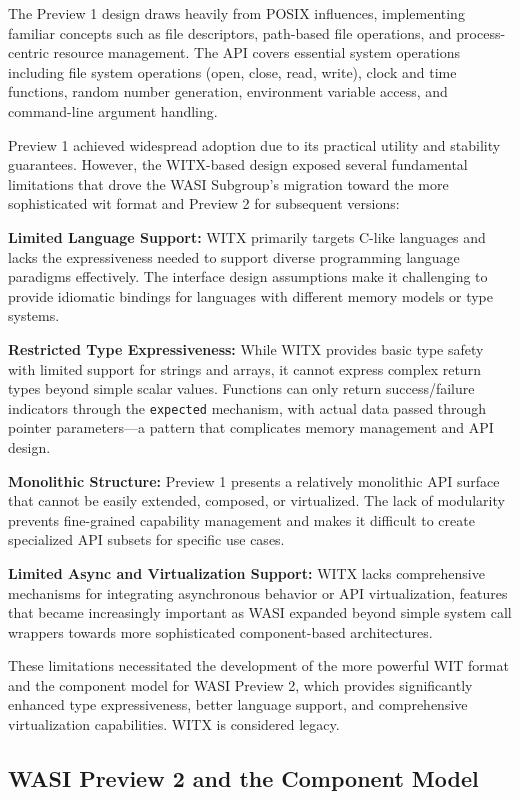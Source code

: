 The Preview 1 design draws heavily from POSIX influences, implementing familiar concepts such as file descriptors, path-based file operations, and process-centric resource management. The API covers essential system operations including file system operations (open, close, read, write), clock and time functions, random number generation, environment variable access, and command-line argument handling.

Preview 1 achieved widespread adoption due to its practical utility and stability guarantees. However, the WITX-based design exposed several fundamental limitations that drove the WASI Subgroup's migration toward the more sophisticated \acrshort{wit} format and Preview 2 for subsequent versions:

\textbf{Limited Language Support:} WITX primarily targets C-like languages and lacks the expressiveness needed to support diverse programming language paradigms effectively. The interface design assumptions make it challenging to provide idiomatic bindings for languages with different memory models or type systems.

\textbf{Restricted Type Expressiveness:} While WITX provides basic type safety with limited support for strings and arrays, it cannot express complex return types beyond simple scalar values. Functions can only return success/failure indicators through the \texttt{expected} mechanism, with actual data passed through pointer parameters—a pattern that complicates memory management and API design.

\textbf{Monolithic Structure:} Preview 1 presents a relatively monolithic API surface that cannot be easily extended, composed, or virtualized. The lack of modularity prevents fine-grained capability management and makes it difficult to create specialized API subsets for specific use cases.

\textbf{Limited Async and Virtualization Support:} WITX lacks comprehensive mechanisms for integrating asynchronous behavior or API virtualization, features that became increasingly important as WASI expanded beyond simple system call wrappers towards more sophisticated component-based architectures.

These limitations necessitated the development of the more powerful WIT format and the component model for WASI Preview 2, which provides significantly enhanced type expressiveness, better language support, and comprehensive virtualization capabilities. WITX is considered legacy.

\subsection{WASI Preview 2 and the Component Model}
\label{subsec:wasi-preview2}


